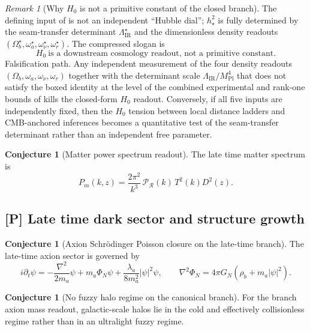 \documentclass[11pt,a4paper]{article}
\theoremstyle{definition}
\newtheorem{conjecture}[theorem]{Conjecture}
\theoremstyle{remark}
\newtheorem*{remark}{Remark}
\newcommand{\Mplunred}{M_{\mathrm{Pl}}}
\begin{document}
\begin{remark}[Why $H_0$ is not a primitive constant of the closed branch]
The defining input of  is not an independent ``Hubble dial'';
$h_\star^2$ is fully determined by the seam-transfer determinant $\Lambda_{\mathrm{IR}}^\star$ and
the dimensionless density readouts $(\Omega_b^\star,\omega_a^\star,\omega_\nu^\star,\omega_r^\star)$.
The compressed slogan is
\[
\boxed{\;H_0\ \text{is a downstream cosmology readout, not a primitive constant.}\;}
\]
Falsification path. Any independent measurement of the four density readouts
$(\Omega_b,\omega_a,\omega_\nu,\omega_r)$ together with the determinant scale
$\Lambda_{\mathrm{IR}}/\Mplunred^4$ that does not satisfy the boxed identity at the level of the
combined experimental and rank-one bounds of  kills the closed-form
$H_0$ readout. Conversely, if all five inputs are independently fixed, then the
$H_0$ tension between local distance ladders and CMB-anchored inferences becomes a quantitative test
of the seam-transfer determinant rather than an independent free parameter.
\end{remark}

\begin{conjecture}[Matter power spectrum readout]
\label{cor:matter_power_spectrum_readout}
The late time matter spectrum is
\[
P_m(k,z)=\frac{2\pi^2}{k^3}\,\mathcal P_{\mathcal R}(k)\,T^2(k)D^2(z).
\]
\end{conjecture}

\subsection{[P] Late time dark sector and structure growth}

\begin{conjecture}[Axion Schr\"odinger Poisson closure on the late-time branch]
\label{thm:axion_schrodinger_poisson_closure}
The late-time axion sector is governed by
\[
i\partial_t\psi
=
-\frac{\nabla^2}{2m_a}\psi+m_a\Phi_N\psi+\frac{\lambda_a}{8m_a^2}|\psi|^2\psi,
\qquad
\nabla^2\Phi_N=4\pi G_N(\rho_b+m_a|\psi|^2).
\]
\end{conjecture}

\begin{conjecture}[No fuzzy halo regime on the canonical branch]
\label{cor:no_fuzzy_halo_regime}
For the branch axion mass readout, galactic-scale halos lie in the cold and effectively
collisionless regime rather than in an ultralight fuzzy regime.
\end{conjecture}
\end{document}
